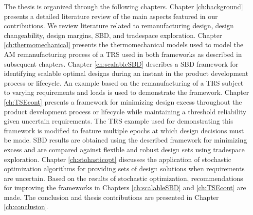 The thesis is organized through the following chapters. Chapter \ref{ch:background} presents a detailed literature review of the main aspects featured in our contributions. We review literature related to remanufacturing design, design changeability, design margins, \ac{SBD}, and tradespace exploration. Chapter \ref{ch:thermomechanical} presents the thermomechanical models used to model the \ac{AM} remanufacturing process of a \ac{TRS} used in both frameworks as described in subsequent chapters. Chapter \ref{ch:scalableSBD} describes a \ac{SBD} framework for identifying scalable optimal designs during an instant in the product development process or lifecycle. An example based on the remanufacturing of a \ac{TRS} subject to varying requirements and loads is used to demonstrate the framework. Chapter \ref{ch:TSEcont} presents a framework for minimizing design excess throughout the product development process or lifecycle while maintaining a threshold reliability given uncertain requirements. The \ac{TRS} example used for demonstrating this framework is modified to feature multiple epochs at which design decisions must be made. \ac{SBD} results are obtained using the described framework for minimizing excess and are compared against flexible and robust design sets using tradespace exploration. Chapter \ref{ch:stohasticopt} discusses the application of stochastic optimization algorithms for providing sets of design solutions when requirements are uncertain. Based on the results of stochastic optimization, recommendations for improving the frameworks in Chapters \ref{ch:scalableSBD} and \ref{ch:TSEcont} are made. The conclusion and thesis contributions are presented in Chapter \ref{ch:conclusion}.